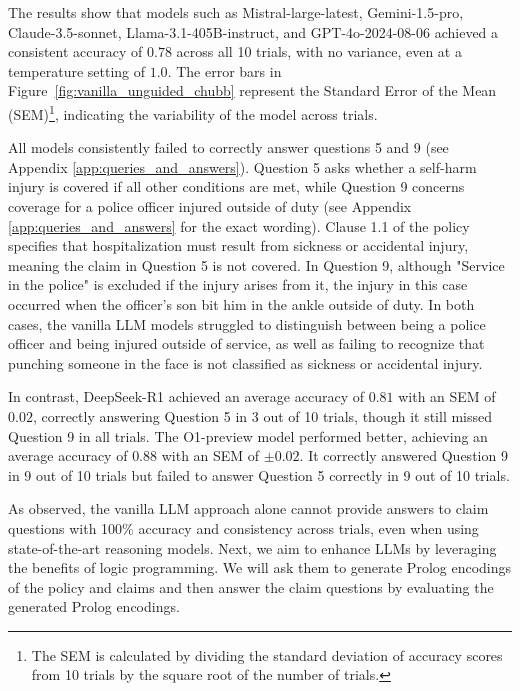 The results show that models such as Mistral-large-latest, Gemini-1.5-pro, Claude-3.5-sonnet, Llama-3.1-405B-instruct, and GPT-4o-2024-08-06 achieved a consistent accuracy of $0.78$ across all 10 trials, with no variance, even at a temperature setting of $1.0$. The error bars in Figure~\ref{fig:vanilla_unguided_chubb} represent the Standard Error of the Mean (SEM)\footnote{The SEM is calculated by dividing the standard deviation of accuracy scores from 10 trials by the square root of the number of trials.}, indicating the variability of the model across trials.

All models consistently failed to correctly answer questions 5 and 9 (see Appendix \ref{app:queries_and_answers}). Question 5 asks whether a self-harm injury is covered if all other conditions are met, while Question 9 concerns coverage for a police officer injured outside of duty (see Appendix \ref{app:queries_and_answers} for the exact wording). Clause 1.1 of the policy specifies that hospitalization must result from sickness or accidental injury, meaning the claim in Question 5 is not covered. In Question 9, although "Service in the police" is excluded if the injury arises from it, the injury in this case occurred when the officer’s son bit him in the ankle outside of duty. In both cases, the vanilla LLM models struggled to distinguish between being a police officer and being injured outside of service, as well as failing to recognize that punching someone in the face is not classified as sickness or accidental injury.

In contrast, DeepSeek-R1 achieved an average accuracy of $0.81$ with an SEM of $0.02$, correctly answering Question 5 in 3 out of 10 trials, though it still missed Question 9 in all trials. The O1-preview model performed better, achieving an average accuracy of $0.88$ with an SEM of $\pm0.02$. It correctly answered Question 9 in 9 out of 10 trials but failed to answer Question 5 correctly in 9 out of 10 trials.

As observed, the vanilla LLM approach alone cannot provide answers to claim questions with 100\% accuracy and consistency across trials, even when using state-of-the-art reasoning models. Next, we aim to enhance LLMs by leveraging the benefits of logic programming. We will ask them to generate Prolog encodings of the policy and claims and then answer the claim questions by evaluating the generated Prolog encodings.
%

